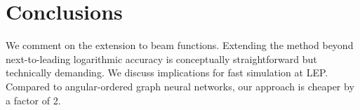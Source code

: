 \section{Conclusions}\label{sec:conclusions}

We comment on the extension to beam functions. Extending the method
beyond next-to-leading logarithmic accuracy is conceptually
straightforward but technically demanding. We discuss implications for
fast simulation at LEP. Compared to angular-ordered graph neural
networks, our approach is cheaper by a factor of 2.

